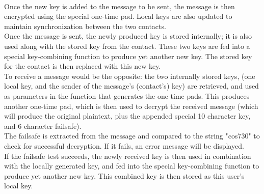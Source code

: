 \vspace{10pt}\\
Once the new key is added to the message to be sent, the message is then encrypted using the special one-time pad. Local keys are also updated to maintain synchronization between the two contacts.
\vspace{10pt}\\
Once the message is sent, the newly produced key is stored internally; it is also used along with the stored key from the contact. These two keys are fed into a special key-combining function to produce yet another new key. The stored key for the contact is then replaced with this new key.
\vspace{10pt}\\
To receive a message would be the opposite: the two internally stored keys, (one local key, and the sender of the message's (contact's) key) are retrieved, and used as parameters in the function that generates the one-time pads. This produces another one-time pad, which is then used to decrypt the received message (which will produce the original plaintext, plus the appended special 10 character key, and 6 character failsafe).
\vspace{10pt}\\
The failsafe is extracted from the message and compared to the string "cos730" to check for successful decryption. If it fails, an error message will be displayed.
\vspace{10pt}\\
If the failsafe test succeeds, the newly received key is then used in combination with the locally generated key, and fed into the special key-combining function to produce yet another new key. This combined key is then stored as this user's local key.